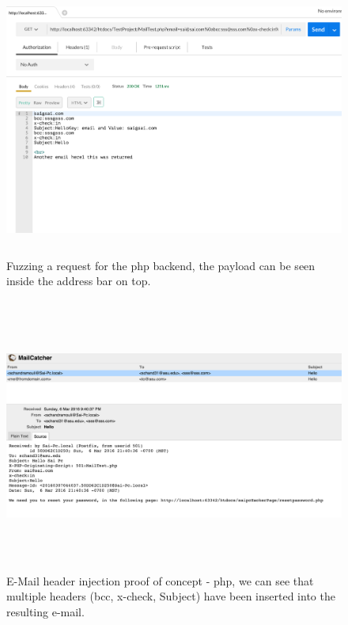 \begin{figure}[!htbp]
	\centering
	\includegraphics[width=14cm, height=9cm]{System/EMI_Postman_PHP}
	\caption{Fuzzing a request for the php backend, the payload can be seen inside the address bar on top.}
	\label{fig:postmanphp}
\end{figure}

\begin{figure}[!htbp]
	\centering
	\includegraphics[width=14cm, height=9cm]{System/EMI_Mailcatcher_PHP}
	\caption{E-Mail header injection proof of concept - php, we can see that multiple headers (bcc, x-check, Subject) have been inserted into the resulting e-mail.}
	\label{fig:mailcatcherphp}
\end{figure}